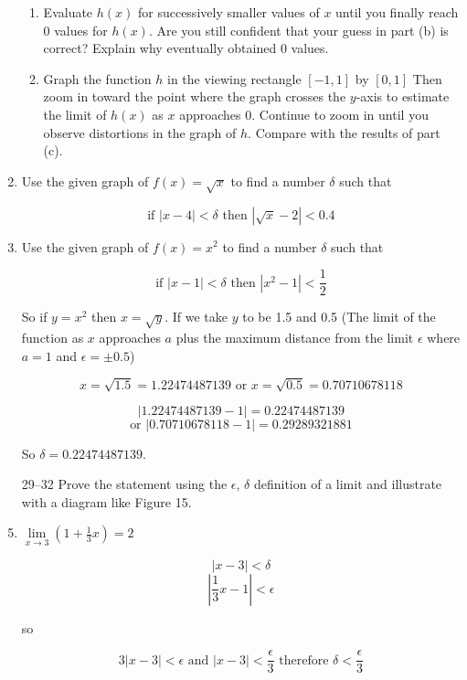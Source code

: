 \documentclass{article}
\begin{document}
\begin{enumerate}
\begin{enumerate}
				\item Evaluate $h(x)$ for successively smaller values of $x$ until you finally reach
					0 values for $h(x)$. Are you still confident that your guess in part (b) is correct?
					Explain why eventually obtained 0 values.
					
				\item Graph the function $h$ in the viewing rectangle $[-1,1]$ by $[0,1]$ Then zoom in
					toward the point where the graph crosses the $y$-axis to estimate the limit of 
					$h(x)$ as $x$ approaches 0. Continue to zoom in until you observe distortions in
					the graph of $h$. Compare with the results of part (c).
			\end{enumerate}
			

			\item Use the given graph of $f(x) = \sqrt{x}$ to find a number $\delta$ such that
			
				$$\text{if } | x - 4 | < \delta\text{ then } |\sqrt{x} - 2 | < 0.4$$

		\item Use the given graph of $f(x) = x^2$ to find a number $\delta$ such that
		
			$$\text{if } |x - 1| < \delta \text{ then } |x^2 - 1| < \frac{1}{2}$$
			
				So if $y = x^2$ then $x = \sqrt{y}$. If we take $y$ to be 1.5 and 0.5 (The limit of the function as $x$ approaches
				$a$ plus the maximum distance from the limit $\epsilon$ where $a = 1$ and $\epsilon = \pm 0.5$)
				
				$$x = \sqrt{1.5} = 1.22474487139 \text{ or } x = \sqrt{0.5} = 0.70710678118$$
				
				$$| 1.22474487139 - 1| = 0.22474487139 $$
				$$ \text{or } |0.70710678118 - 1 | = 0.29289321881$$
				
				So $\delta = 0.22474487139$.
				
		\item[29--32] Prove the statement using the $\epsilon$, $\delta$ definition of a limit and illustrate with a diagram
				like Figure 15.
				
		\item $\lim \limits _{x \to 3} (1 + \frac{1}{3}x) = 2$ 
		
			$$| x - 3| < \delta$$
			$$|\frac{1}{3}x - 1 | < \epsilon$$
			
			so
			
			$$3|x - 3| < \epsilon \text{ and } |x - 3| < \frac{\epsilon}{3} \text{ therefore } \delta < \frac{\epsilon}{3}$$
			

\end{enumerate}
\end{document}
